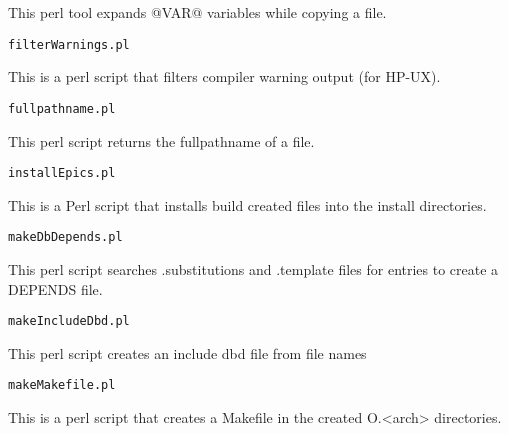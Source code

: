 \begin{description}\item This perl tool expands @VAR@ variables while copying a file.

\end{description}\begin{verbatim}filterWarnings.pl
\end{verbatim}\begin{description}\item This is a perl script that filters compiler warning output (for HP-UX).

\end{description}\begin{verbatim}fullpathname.pl
\end{verbatim}\begin{description}\item This perl script returns the fullpathname of a file.

\end{description}\begin{verbatim}installEpics.pl
\end{verbatim}\begin{description}\item This is a Perl script that installs build created files into the install directories.

\end{description}\begin{verbatim}makeDbDepends.pl
\end{verbatim}\begin{description}\item This perl script searches .substitutions and .template files for entries to create a DEPENDS file.

\end{description}\begin{verbatim}makeIncludeDbd.pl
\end{verbatim}\begin{description}\item This perl script creates an include dbd file from file names

\end{description}\begin{verbatim}makeMakefile.pl
\end{verbatim}\begin{description}\item This is a perl script that creates a Makefile in the created O.\textless{}arch\textgreater{} directories.


\end{description}
